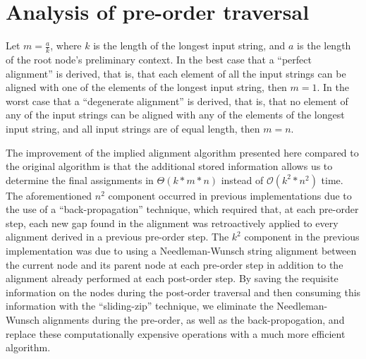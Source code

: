 \documentclass{bmcart}
\begin{document}
%
%


\section*{Analysis of pre-order traversal}

Let $m = \frac{a}{k}$, where $k$ is the length of the longest input string, and $a$ is the length of the root node's preliminary context.
In the best case that a ``perfect alignment'' is derived, that is, that each element of all the input strings can be aligned with one of the elements of the longest input string, then $m = 1$.
In the worst case that a ``degenerate alignment'' is derived, that is, that no element of any of the input strings can be aligned with any of the elements of the longest input string, and all input strings are of equal length, then $m = n$.

The improvement of the implied alignment algorithm presented here compared to the original algorithm is that the additional stored information allows us to determine the final assignments in $\Theta(k * m * n)$ instead of $\mathcal{O}(k^2 * n^2)$ time. 
The aforementioned $n^2$ component occurred in previous implementations due to the use of a ``back-propagation'' technique, which required that, at each pre-order step, each new gap found in the alignment was retroactively applied to every alignment derived in a previous pre-order step.
The $k^2$ component in the previous implementation was due to using a Needleman-Wunsch string alignment between the current node and its parent node at each pre-order step in addition to the alignment already performed at each post-order step.
By saving the requisite information on the nodes during the post-order traversal and then consuming this information with the ``sliding-zip'' technique, we eliminate the Needleman-Wunsch alignments during the pre-order, as well as the back-propogation, and replace these computationally expensive operations with a much more efficient algorithm.
\end{document}
